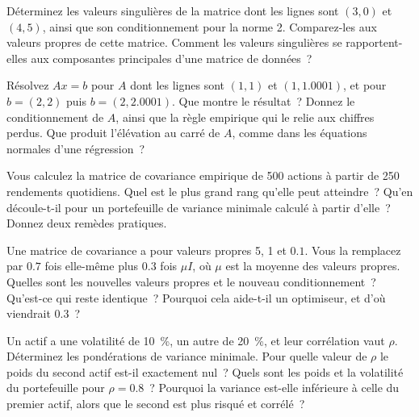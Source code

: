 \begin{question}\label{iq:iv1:linear-algebra:10}
Déterminez les valeurs singulières de la matrice dont les lignes sont $(3, 0)$ et $(4, 5)$, ainsi que son conditionnement pour la norme 2. Comparez-les aux valeurs propres de cette matrice. Comment les valeurs singulières se rapportent-elles aux composantes principales d'une matrice de données~?
\end{question}

\begin{question}\label{iq:iv1:linear-algebra:11}
Résolvez $Ax = b$ pour $A$ dont les lignes sont $(1, 1)$ et $(1, 1.0001)$, et pour $b = (2, 2)$ puis $b = (2, 2.0001)$. Que montre le résultat~? Donnez le conditionnement de $A$, ainsi que la règle empirique qui le relie aux chiffres perdus. Que produit l'élévation au carré de $A$, comme dans les équations normales d'une régression~?
\end{question}

\begin{question}\label{iq:iv1:linear-algebra:12}
Vous calculez la matrice de covariance empirique de 500 actions à partir de 250 rendements quotidiens. Quel est le plus grand rang qu'elle peut atteindre~? Qu'en découle-t-il pour un portefeuille de variance minimale calculé à partir d'elle~? Donnez deux remèdes pratiques.
\end{question}

\begin{question}\label{iq:iv1:linear-algebra:13}
Une matrice de covariance a pour valeurs propres 5, 1 et $0.1$. Vous la remplacez par $0.7$ fois elle-même plus $0.3$ fois $\mu I$, où $\mu$ est la moyenne des valeurs propres. Quelles sont les nouvelles valeurs propres et le nouveau conditionnement~? Qu'est-ce qui reste identique~? Pourquoi cela aide-t-il un optimiseur, et d'où viendrait $0.3$~?
\end{question}

\begin{question}\label{iq:iv1:linear-algebra:14}
Un actif a une volatilité de 10~\%, un autre de 20~\%, et leur corrélation vaut $\rho$. Déterminez les pondérations de variance minimale. Pour quelle valeur de $\rho$ le poids du second actif est-il exactement nul~? Quels sont les poids et la volatilité du portefeuille pour $\rho = 0.8$~? Pourquoi la variance est-elle inférieure à celle du premier actif, alors que le second est plus risqué et corrélé~?
\end{question}

